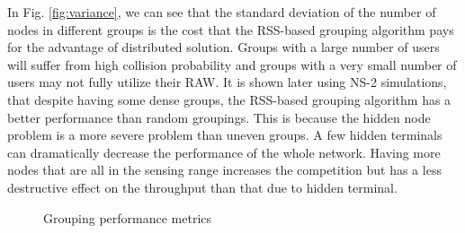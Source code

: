In Fig. \ref{fig:variance}, we can see that the standard deviation of the number of nodes in different groups is the cost that the RSS-based grouping algorithm pays for the advantage of distributed solution. Groups with a large number of users will suffer from high collision probability and groups with a very small number of users may not fully utilize their RAW. It is shown later using NS-2 simulations, that despite having some dense groups, the RSS-based grouping algorithm has a better performance than random groupings. This is because the hidden node problem is a more severe problem than uneven groups. A few hidden terminals can dramatically decrease the performance of the whole network. Having more nodes that are all in the sensing range increases the competition but has a less destructive effect on the throughput than that due to hidden terminal.



\begin{figure} [!tbp]
  \centering
  \caption{Grouping performance metrics}
  \label{fig:metricx}
\end{figure}

